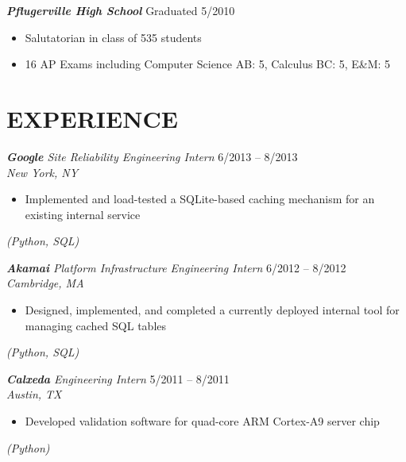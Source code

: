 \documentclass[margin]{res}
\begin{document}
\begin{resume}
                    {\sl \bf Pflugerville High School} \hfill Graduated 5/2010
                    \begin{itemize} \itemsep -2pt %
                         \item Salutatorian in class of 535 students
                         \item 16 AP Exams including Computer Science AB: 5, 
                               Calculus BC: 5, E\&M: 5
                    \end{itemize}

\section{EXPERIENCE} 
                    {\sl{\bf Google} Site Reliability Engineering Intern} 
                    \hfill 6/2013 -- 8/2013 \\
                    {\sl  New York, NY}
                    \begin{itemize} \itemsep -2pt %
                        \setlength{\topsep}{0pt}
                         \item Implemented and load-tested a SQLite-based
                           caching mechanism for an existing internal service
                    \end{itemize} 
                    \vspace{-4.5mm} {\sl (Python, SQL)}

                    {\sl {\bf Akamai} 
                      Platform Infrastructure Engineering Intern} 
                    \hfill 6/2012 -- 8/2012 \\
                    {\sl Cambridge, MA}
                    \begin{itemize} \itemsep -2pt %
                         \item Designed, implemented, and completed a 
                           currently deployed internal tool for managing cached 
                           SQL tables
                    \end{itemize}
                    \vspace{-4.5mm} {\sl (Python, SQL)}

                    {\sl {\bf Calxeda} Engineering Intern} 
                    \hfill 5/2011 -- 8/2011 \\
                    {\sl Austin, TX}
                    \begin{itemize} \itemsep -2pt %
                          \item Developed validation software for quad-core ARM 
                            Cortex-A9 server chip
                    \end{itemize}
                    \vspace{-4.5mm} {\sl (Python)}


\end{resume}
\end{document}
